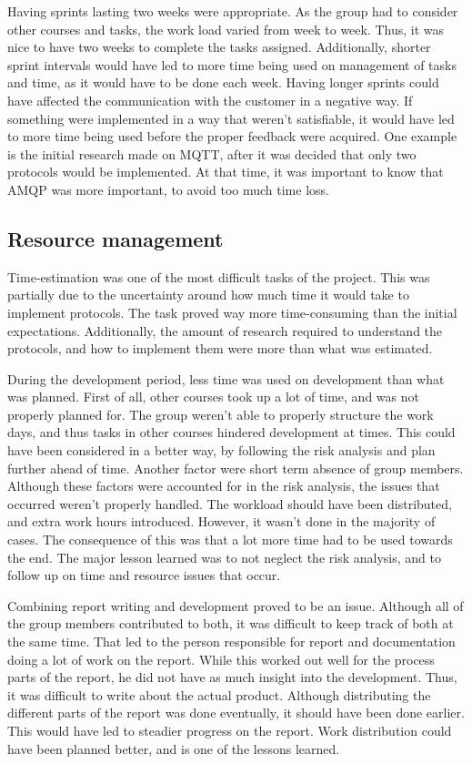 Having sprints lasting two weeks were appropriate. As the group had to consider other courses and tasks, the work load varied from week to week. Thus, it was nice to have two weeks to complete the tasks assigned. Additionally, shorter sprint intervals would have led to more time being used on management of tasks and time, as it would have to be done each week. Having longer sprints could have affected the communication with the customer in a negative way. If something were implemented in a way that weren't satisfiable, it would have led to more time being used before the proper feedback were acquired. One example is the initial research made on MQTT, after it was decided that only two protocols would be implemented. At that time, it was important to know that AMQP was more important, to avoid too much time loss.

\subsection{Resource management}
\label{subsec:project_evaluation-development-time_management}

Time-estimation was one of the most difficult tasks of the project. This was partially due to the uncertainty around how much time it would take to implement protocols. The task proved way more time-consuming than the initial expectations. Additionally, the amount of research required to understand the protocols, and how to implement them were more than what was estimated.

During the development period, less time was used on development than what was planned. First of all, other courses took up a lot of time, and was not properly planned for. The group weren't able to properly structure the work days, and thus tasks in other courses hindered development at times. This could have been considered in a better way, by following the risk analysis and plan further ahead of time. Another factor were short term absence of group members. Although these factors were accounted for in the risk analysis, the issues that occurred weren't properly handled. The workload should have been distributed, and extra work hours introduced. However, it wasn't done in the majority of cases. The consequence of this was that a lot more time had to be used towards the end. The major lesson learned was to not neglect the risk analysis, and to follow up on time and resource issues that occur. 

Combining report writing and development proved to be an issue. Although all of the group members contributed to both, it was difficult to keep track of both at the same time. That led to the person responsible for report and documentation doing a lot of work on the report. While this worked out well for the process parts of the report, he did not have as much insight into the development. Thus, it was difficult to write about the actual product. Although distributing the different parts of the report was done eventually, it should have been done earlier. This would have led to steadier progress on the report. Work distribution could have been planned better, and is one of the lessons learned.

